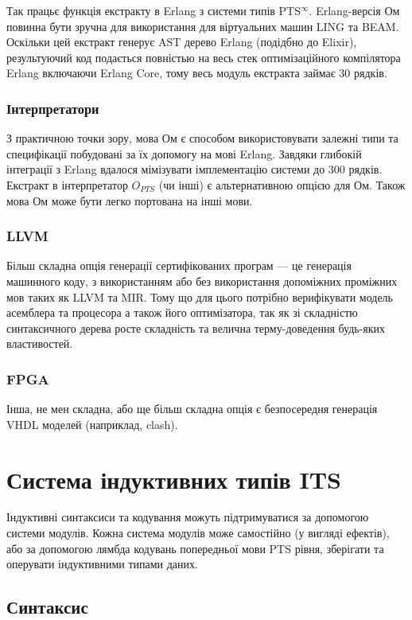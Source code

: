 Так працьє функція екстракту в Erlang з системи типів PTS$^\infty$.
Erlang-версія Ом повинна бути зручна для використання для
віртуальних машин LING та BEAM. Оскільки цей екстракт генерує
AST дерево Erlang (подідбно до Elixir), результуючий код
подається повністью на весь стек оптимізаційного компілятора
Erlang включаючи Erlang Core, тому весь модуль екстракта займає 30 рядків.

\subsubsection{Інтерпретатори}
З практичною точки зору, мова Ом є способом використовувати залежні типи
та специфікації побудовані за їх допомогу на мові Erlang.
Завдяки глибокій інтеграції з Erlang вдалося мімізувати
імплементацію системи до 300 рядків.
Екстракт в інтерпретатор $O_{PTS}$ (чи інші) є альтернативною опцією для Ом.
Також мова Ом може бути легко портована на інші мови.

\subsubsection{LLVM}
Більш складна опція генерації сертифікованих програм --- це генерація машинного коду,
з використанням або без використання допоміжних проміжних мов таких як LLVM та MIR.
Тому що для цього потрібно верифікувати модель асемблера та процесора а також
його оптимізатора, так як зі складністю синтаксичного дерева росте складність
та велична терму-доведення будь-яких властивостей.

\subsubsection{FPGA}
Інша, не мен складна, або ще більш складна опція є безпосередня генерація
VHDL моделей (наприклад, clash).

\newpage
\section{Система індуктивних типів ITS}
Індуктивні синтаксиси та кодування можуть підтримуватися за допомогою системи модулів.
Кожна система модулів може самостійно (у вигляді ефектів), або за допомогою лямбда кодувань
попередньої мови PTS рівня, зберігати та оперувати індуктивними типами даних.

\subsection{Синтаксис}

